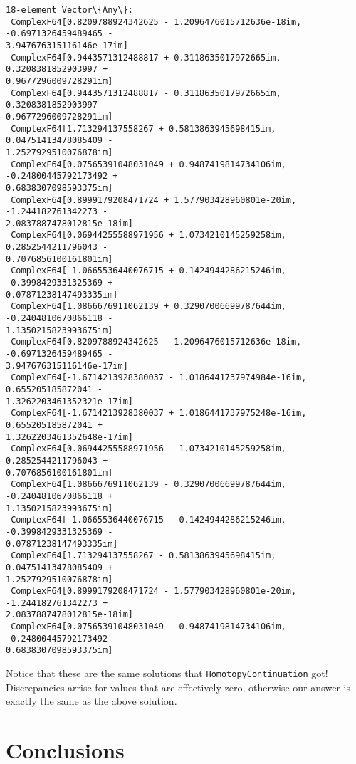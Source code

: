 \documentclass[11pt]{article}
\begin{document}
            \begin{tcolorbox}[breakable, size=fbox, boxrule=.5pt, pad at break*=1mm, opacityfill=0]
\begin{Verbatim}[commandchars=\\\{\}]
18-element Vector\{Any\}:
 ComplexF64[0.8209788924342625 - 1.2096476015712636e-18im, -0.6971326459489465 -
3.947676315116146e-17im]
 ComplexF64[0.9443571312488817 + 0.3118635017972665im, 0.3208381852903997 +
0.9677296009728291im]
 ComplexF64[0.9443571312488817 - 0.3118635017972665im, 0.3208381852903997 -
0.9677296009728291im]
 ComplexF64[1.713294137558267 + 0.5813863945698415im, 0.04751413478085409 -
1.2527929510076878im]
 ComplexF64[0.07565391048031049 + 0.9487419814734106im, -0.24800445792173492 +
0.6838307098593375im]
 ComplexF64[0.8999179208471724 + 1.577903428960801e-20im, -1.244182761342273 -
2.0837887478012815e-18im]
 ComplexF64[0.06944255588971956 + 1.0734210145259258im, 0.2852544211796043 -
0.7076856100161801im]
 ComplexF64[-1.0665536440076715 + 0.1424944286215246im, -0.3998429331325369 +
0.07871238147493335im]
 ComplexF64[1.0866676911062139 + 0.32907006699787644im, -0.2404810670866118 -
1.1350215823993675im]
 ComplexF64[0.8209788924342625 - 1.2096476015712636e-18im, -0.6971326459489465 -
3.947676315116146e-17im]
 ComplexF64[-1.6714213928380037 - 1.0186441737974984e-16im, 0.655205185872041 -
1.3262203461352321e-17im]
 ComplexF64[-1.6714213928380037 + 1.0186441737975248e-16im, 0.655205185872041 +
1.3262203461352648e-17im]
 ComplexF64[0.06944255588971956 - 1.0734210145259258im, 0.2852544211796043 +
0.7076856100161801im]
 ComplexF64[1.0866676911062139 - 0.32907006699787644im, -0.2404810670866118 +
1.1350215823993675im]
 ComplexF64[-1.0665536440076715 - 0.1424944286215246im, -0.3998429331325369 -
0.07871238147493335im]
 ComplexF64[1.713294137558267 - 0.5813863945698415im, 0.04751413478085409 +
1.2527929510076878im]
 ComplexF64[0.8999179208471724 - 1.577903428960801e-20im, -1.244182761342273 +
2.0837887478012815e-18im]
 ComplexF64[0.07565391048031049 - 0.9487419814734106im, -0.24800445792173492 -
0.6838307098593375im]
\end{Verbatim}
\end{tcolorbox}
        
    Notice that these are the same solutions that
\texttt{HomotopyContinuation} got! Discrepancies arrise for values that
are effectively zero, otherwise our answer is exactly the same as the
above solution.

\hypertarget{conclusions}{%
\section{Conclusions}\label{conclusions}}
\end{document}

